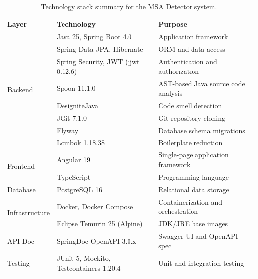 \begin{table}[htbp]
    \centering
    \footnotesize
    \begin{tabular}{|l|l|l|}
        \hline
        \textbf{Layer}                  & \textbf{Technology}                               & \textbf{Purpose}                      \\
        \hline\hline
        \multirow{8}{*}{Backend}        & Java 25, Spring Boot 4.0                          & Application framework                 \\
        \cline{2-3}
        & Spring Data JPA, Hibernate                        & ORM and data access                   \\
        \cline{2-3}
        & Spring Security, JWT (jjwt 0.12.6) \cite{RFC7519} & Authentication and authorization      \\
        \cline{2-3}
        & Spoon 11.1.0 \cite{Pawlak2016}                    & AST-based Java source code analysis   \\
        \cline{2-3}
        & DesigniteJava \cite{Sharma2024}                   & Code smell detection                  \\
        \cline{2-3}
        & JGit 7.1.0                                        & Git repository cloning                \\
        \cline{2-3}
        & Flyway                                            & Database schema migrations            \\
        \cline{2-3}
        & Lombok 1.18.38                   & Boilerplate reduction \\
        \hline
        \multirow{2}{*}{Frontend}       & Angular 19                                        & Single-page application framework     \\
        \cline{2-3}
        & TypeScript                                        & Programming language                  \\
        \hline
        Database                        & PostgreSQL 16                                     & Relational data storage               \\
        \hline
        \multirow{2}{*}{Infrastructure} & Docker, Docker Compose                            & Containerization and orchestration    \\
        \cline{2-3}
        & Eclipse Temurin 25 (Alpine)                       & JDK/JRE base images                   \\
        \hline
        API Doc               & SpringDoc OpenAPI 3.0.x                           & Swagger UI and OpenAPI spec           \\
        \hline
        Testing                         & JUnit 5, Mockito, Testcontainers 1.20.4            & Unit and integration testing          \\
        \hline
    \end{tabular}
    \caption{Technology stack summary for the MSA Detector system.
    }
    \label{tab:tech-stack}
\end{table}


